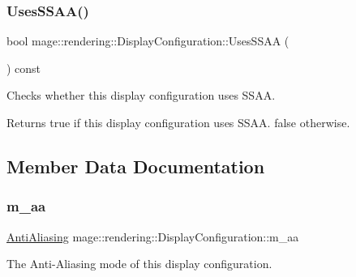 \subsubsection{\texorpdfstring{Uses\+S\+S\+A\+A()}{UsesSSAA()}}
{\footnotesize\ttfamily bool mage\+::rendering\+::\+Display\+Configuration\+::\+Uses\+S\+S\+AA (\begin{DoxyParamCaption}{ }\end{DoxyParamCaption}) const\hspace{0.3cm}{\ttfamily [noexcept]}}

Checks whether this display configuration uses S\+S\+AA.

\begin{DoxyReturn}{Returns}
{\ttfamily true} if this display configuration uses S\+S\+AA. {\ttfamily false} otherwise. 
\end{DoxyReturn}


\subsection{Member Data Documentation}
\mbox{\label{classmage_1_1rendering_1_1_display_configuration_a03754a6d492393f70f68c619311dfa4c}} 
\subsubsection{\texorpdfstring{m\+\_\+aa}{m\_aa}}
{\footnotesize\ttfamily \mbox{\hyperlink{namespacemage_1_1rendering_ac3f75e49e92b42f2f5fb55c450d8899c}{Anti\+Aliasing}} mage\+::rendering\+::\+Display\+Configuration\+::m\+\_\+aa\hspace{0.3cm}{\ttfamily [private]}}

The Anti-\/\+Aliasing mode of this display configuration. \mbox{\label{classmage_1_1rendering_1_1_display_configuration_a307a8e6e0b1beb93175a6db519759e86}} 
